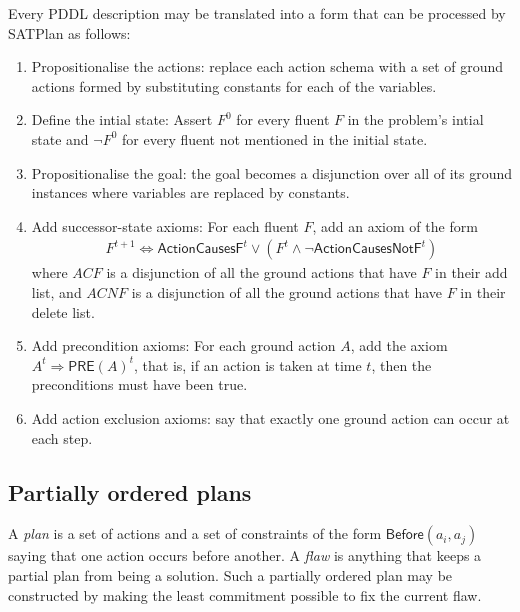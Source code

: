 \documentclass{article}
\begin{document}
\begin{theorem}
	Every PDDL description may be translated into a form that can be
	processed by SATPlan as follows:
	\begin{enumerate}
		\item Propositionalise the actions: replace each action schema with a set of ground actions
		      formed by substituting constants for each of the variables.
		\item Define the intial state: Assert $F^0$ for every fluent $F$ in the problem's intial state
		      and $\neg F^0$ for every fluent not mentioned in the initial state.
		\item Propositionalise the goal: the goal becomes a disjunction over all of its ground instances
		      where variables are replaced by constants.
		\item Add successor-state axioms: For each fluent $F$, add an axiom of the form \begin{align*}
			      F^{t+1} \Leftrightarrow \textsf{ActionCausesF}^t \vee (F^t \wedge \neg \textsf{ActionCausesNotF}^t)
		      \end{align*}
		      where $ACF$ is a disjunction of all the ground actions that have $F$ in
		      their add list, and $ACNF$ is a disjunction of all the ground actions that have $F$
		      in their delete list.
		\item Add precondition axioms: For each ground action $A$, add the axiom $A^t\Rightarrow\textsf{PRE}(A)^t$,
		      that is, if an action is taken at time $t$, then the preconditions must have been true.
		\item Add action exclusion axioms: say that exactly one ground action can occur at each step.
	\end{enumerate}
\end{theorem}

\subsection{Partially ordered plans}

\begin{definition}
	A \emph{plan} is a set of actions and a set of constraints of the form $\textsf{Before}(a_i, a_j)$ saying
	that one action occurs before another. A \emph{flaw} is anything that keeps a partial plan from
	being a solution.
	Such a partially ordered plan may be constructed by making the least commitment possible to fix the
	current flaw.
\end{definition}
\end{document}

